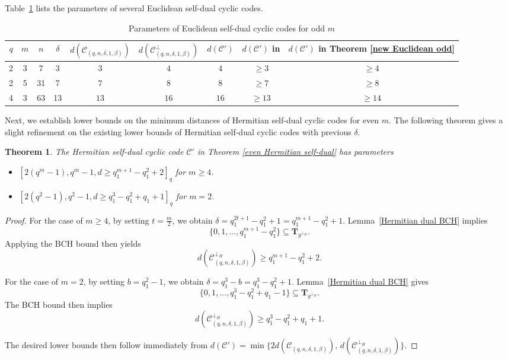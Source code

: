 \documentclass[10pt,a4paper]{amsart}
\newtheorem{theorem}{Theorem}
\begin{document}
Table~\ref{odd} lists the parameters of several Euclidean self-dual cyclic codes.

\begin{table}[htbp]
  \centering 
  \caption{Parameters of Euclidean self-dual cyclic codes for odd $m$}
  \label{odd}
  \begin{tabular}{|c|c|c|c|c|c|c|c|c|}
    \hline 
    $q$ & $m$ & $n$ & $\delta$ & $d(\mathcal{C}_{(q,n,\delta,1,\beta)})$ & $d(\mathcal{C}_{(q,n,\delta,1,\beta)}^\perp)$ & $d(\mathcal{C}')$ & $d(\mathcal{C}')$ in \cite{10856234} & $d(\mathcal{C}')$ in Theorem \ref{new Euclidean odd} \\
    \hline
    2 & 3 & 7 & 3 & $3$ & $4$ & $4$ & $\ge 3$ & $\ge 4$ \\
    \hline
    2 & 5 & 31 & 7 & $7$ & $8$ & $8$ & $\ge 7$ & $\ge 8$ \\
    \hline
    4 & 3 & 63 & 13 & $13$ & $16$ & $16$ & $\ge 13$ & $\ge 14$ \\
    \hline
  \end{tabular}
\end{table}

Next, we establish lower bounds on the minimum distances of Hermitian self-dual cyclic codes for even $m$. The following theorem gives a slight refinement on the existing lower bounds of Hermitian self-dual cyclic codes with previous $\delta$.
\begin{theorem}
    \label{new Hermitian self-dual}
    The Hermitian self-dual cyclic code $\mathcal{C}'$ in Theorem \ref{even Hermitian self-dual} has parameters
    \begin{itemize}
        \item $[2(q^m-1),q^m-1,d\ge q_1^{m+1}-q_1^2+2]_q$ for $m\ge 4$.
        \item $[2(q^2-1),q^2-1,d\ge q_1^3-q_1^2+q_1+1]_q$ for $m=2$.
    \end{itemize}
\end{theorem}

\begin{proof}
For the case of $m \ge 4$, by setting $t = \frac{m}{2}$, we obtain $\delta = q_1^{2t+1} - q_1^2 + 1 = q_1^{m+1} - q_1^2 + 1$. Lemma~\ref{Hermitian dual BCH} implies
\[
\{0,1,\dots,q_1^{m+1} - q_1^2\} \subseteq \mathbf{T}_{g^{\perp_H}}.
\]
Applying the BCH bound then yields
\[
d(\mathcal{C}^{\perp_H}_{(q,n,\delta,1,\beta)}) \ge q_1^{m+1} - q_1^2 + 2.
\]

For the case of $m = 2$, by setting $b = q_1^2 - 1$, we obtain $\delta = q_1^3 - b = q_1^3 - q_1^2 + 1$. Lemma~\ref{Hermitian dual BCH} gives
\[
\{0,1,\dots,q_1^3 - q_1^2 + q_1 - 1\} \subseteq \mathbf{T}_{g^{\perp_H}}.
\]
The BCH bound then implies
\[
d(\mathcal{C}^{\perp_H}_{(q,n,\delta,1,\beta)}) \ge q_1^3 - q_1^2 + q_1 + 1.
\]

The desired lower bounds then follow immediately from
\(
d(\mathcal{C}') = \min\{2d(\mathcal{C}_{(q,n,\delta,1,\beta)}),\, d(\mathcal{C}^{\perp_H}_{(q,n,\delta,1,\beta)})\}.
\)
\end{proof}
\end{document}
